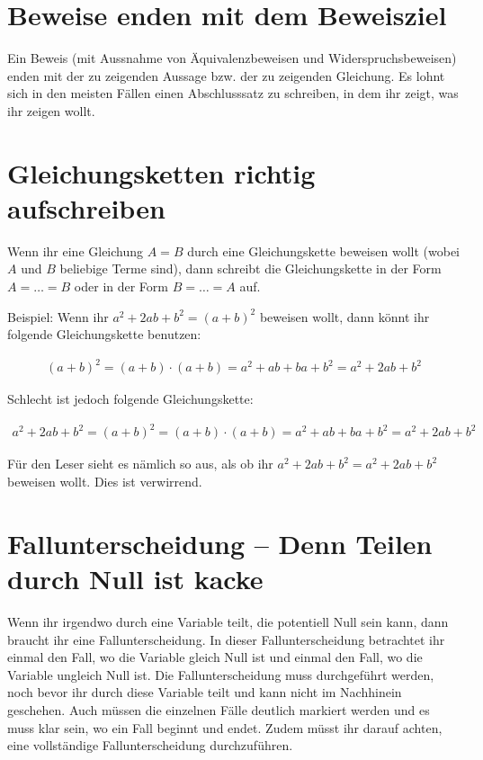 \documentclass[a4paper]{article}
\begin{document}
\section{Beweise enden mit dem Beweisziel}

Ein Beweis (mit Aussnahme von Äquivalenzbeweisen und Widerspruchsbeweisen) enden mit der zu zeigenden Aussage bzw. der zu zeigenden Gleichung. Es lohnt sich in den meisten Fällen einen Abschlusssatz zu schreiben, in dem ihr zeigt, was ihr zeigen wollt.

\section{Gleichungsketten richtig aufschreiben}

Wenn ihr eine Gleichung $A=B$ durch eine Gleichungskette beweisen wollt (wobei $A$ und $B$ beliebige Terme sind), dann schreibt die Gleichungskette in der Form $A = \ldots = B$ oder in der Form $B = \ldots = A$ auf.

Beispiel: Wenn ihr $a^2+2ab+b^2=(a+b)^2$ beweisen wollt, dann könnt ihr folgende Gleichungskette benutzen:

\begin{align}
  (a+b)^2 = (a+b)\cdot (a+b) = a^2 + ab + ba + b^2 = a^2 + 2ab + b^2
\end{align}

Schlecht ist jedoch folgende Gleichungskette:

\begin{align}
  a^2 + 2ab + b^2 = (a+b)^2 = (a+b)\cdot (a+b) = a^2 + ab + ba + b^2 = a^2 + 2ab + b^2
\end{align}

Für den Leser sieht es nämlich so aus, als ob ihr $a^2+2ab + b^2 = a^2 + 2ab + b^2$ beweisen wollt. Dies ist verwirrend.

\section{Fallunterscheidung – Denn Teilen durch Null ist kacke}

Wenn ihr irgendwo durch eine Variable teilt, die potentiell Null sein kann, dann braucht ihr eine Fallunterscheidung. In dieser Fallunterscheidung betrachtet ihr einmal den Fall, wo die Variable gleich Null ist und einmal den Fall, wo die Variable ungleich Null ist. Die Fallunterscheidung muss durchgeführt werden, noch bevor ihr durch diese Variable teilt und kann nicht im Nachhinein geschehen. Auch müssen die einzelnen Fälle deutlich markiert werden und es muss klar sein, wo ein Fall beginnt und endet. Zudem müsst ihr darauf achten, eine vollständige Fallunterscheidung durchzuführen.
\end{document}
